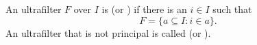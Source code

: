 An ultrafilter $F$ over $I$ is  (or ) if there is an $i \in I$ such that
$$F = \{a \subseteq I : i \in a\}.$$
An ultrafilter that is not principal is called  (or ).
